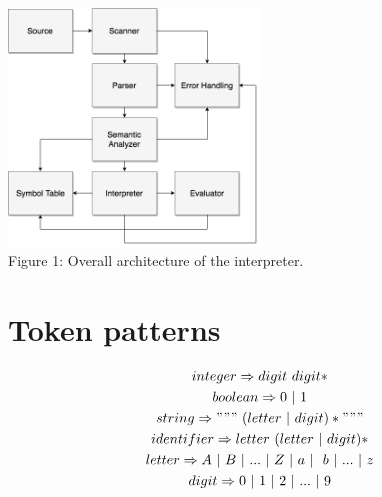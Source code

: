 \documentclass[fleqn]{article}
\begin{document}
{\centering
    \vspace*{1cm} 
    \includegraphics[width=0.5\textwidth]{architecture}
    \\Figure 1: Overall architecture of the interpreter.
    \par
}
 
\newpage
\section{Token patterns}

\begin{gather*}
    integer \Rightarrow digit \ digit* \\
    boolean \Rightarrow 0 \ | \ 1 \\
    string \Rightarrow """ \ (letter \ | \ digit)* """ \\
    identifier \Rightarrow letter \ (letter \ | \ digit)* \\
    letter \Rightarrow  A \ | \ B \ | \ . . . \ | \ Z \ | \ a \ | \ b \ | \ . . . \ | \ z \\
    digit \Rightarrow  0 \ | \ 1 \ | \ 2 \ | \ . . . \ | \ 9
\end{gather*}
\end{document}
